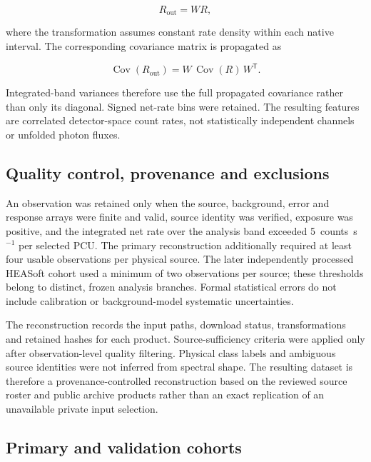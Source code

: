 \documentclass[final,5p,authoryear,nopreprintline]{elsarticle}
\begin{document}
\begin{equation}
\label{eq:overlap}
R_{\mathrm{out}} = W R ,
\end{equation}

where the transformation assumes constant rate density within each native interval. The corresponding covariance matrix is propagated as

\begin{equation}
\label{eq:covariance}
\operatorname{Cov}(R_{\mathrm{out}})
=
W\,\operatorname{Cov}(R)\,W^{\mathsf{T}} .
\end{equation}

Integrated-band variances therefore use the full propagated covariance rather than only its diagonal. Signed net-rate bins were retained. The resulting features are correlated detector-space count rates, not statistically independent channels or unfolded photon fluxes.

\subsection{Quality control, provenance and exclusions}

An observation was retained only when the source, background, error and response arrays were finite and valid, source identity was verified, exposure was positive, and the integrated net rate over the analysis band exceeded 5~counts~s$^{-1}$ per selected PCU. The primary reconstruction additionally required at least four usable observations per physical source. The later independently processed HEASoft cohort used a minimum of two observations per source; these thresholds belong to distinct, frozen analysis branches. Formal statistical errors do not include calibration or background-model systematic uncertainties.

The reconstruction records the input paths, download status, transformations and retained hashes for each product. Source-sufficiency criteria were applied only after observation-level quality filtering. Physical class labels and ambiguous source identities were not inferred from spectral shape. The resulting dataset is therefore a provenance-controlled reconstruction based on the reviewed source roster and public archive products rather than an exact replication of an unavailable private input selection.

\subsection{Primary and validation cohorts}
\end{document}
